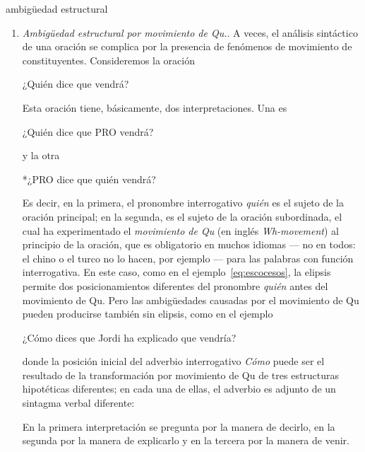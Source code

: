 \begin{persabermes}{ambigüedad estructural}
\begin{enumerate}
\item \emph{Ambigüedad estructural por movimiento de Qu.}. A veces, el análisis sintáctico de una oración se complica por la presencia de fenómenos de movimiento de constituyentes. Consideremos la oración \begin{example} ¿Quién dice que vendrá? \end{example} Esta oración tiene, básicamente, dos interpretaciones. Una es \begin{example} ¿Quién dice que PRO vendrá? \end{example} y la otra \begin{example} *¿PRO dice que quién vendrá? \end{example} Es decir, en la primera, el pronombre interrogativo \emph{quién} es el sujeto de la oración principal; en la segunda, es el sujeto de la oración subordinada, el cual ha experimentado el \emph{movimiento de Qu} (en inglés \emph{Wh-movement}) al principio de la oración, que es obligatorio en muchos idiomas --- no en todos: el chino o el turco no lo hacen, por ejemplo --- para las palabras con función interrogativa. En este caso, como en el ejemplo~\ref{eq:escocesos}, la elipsis permite dos posicionamientos diferentes del pronombre \emph{quién} antes del movimiento de Qu. Pero las ambigüedades causadas por el movimiento de Qu pueden producirse también sin elipsis, como en el ejemplo \begin{exemple} ¿Cómo dices que Jordi ha explicado que vendría? \end{exemple} donde la posición inicial del adverbio interrogativo \emph{Cómo} puede ser el resultado de la transformación por movimiento de Qu de tres estructuras hipotéticas diferentes; en cada una de ellas, el adverbio es adjunto de un sintagma verbal diferente:  En la primera interpretación se pregunta por la manera de decirlo, en la segunda por la manera de explicarlo y en la tercera por la manera de venir. 


\end{enumerate}
\end{persabermes}
